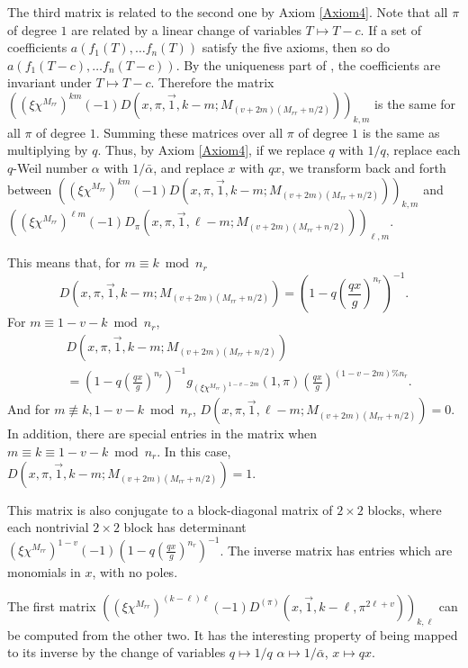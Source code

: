 \documentclass[11pt,letterpaper]{article}
\theoremstyle{definition}
\theoremstyle{remark}
\numberwithin{equation}{section}
\theoremstyle{dotless}
\begin{document}
The third matrix is related to the second one by Axiom \ref{Axiom4}. Note that all $\pi$ of degree $1$ are related by a linear change of variables $T \mapsto T-c$. If a set of coefficients $a(f_1(T), \ldots f_n(T))$ satisfy the five axioms, then so do $a(f_1(T-c), \ldots f_n(T-c))$. By the uniqueness part of \cite[Theorem 1.1]{s-amds}, the coefficients are invariant under $T \mapsto T-c$. Therefore the matrix $\left( (\xi \chi^{M_{rr}})^{k m}(-1)D(x, \pi, \vec{1}, k-m; M_{(v+2m)(M_{rr}+n/2)}) \right)_{k,m}$ is the same for all $\pi$ of degree $1$. Summing these matrices over all $\pi$ of degree $1$ is the same as multiplying by $q$. Thus, by Axiom \ref{Axiom4}, if we replace $q$ with $1/q$, replace each $q$-Weil number $\alpha$ with $1/\bar{\alpha}$, and replace $x$ with $qx$, we transform back and forth between $\left( (\xi \chi^{M_{rr}})^{k m}(-1)D(x, \pi, \vec{1}, k-m; M_{(v+2m)(M_{rr}+n/2)}) \right)_{k,m}$ and $\left((\xi \chi^{M_{rr}})^{\ell m}(-1) D_\pi(x, \pi, \vec{1}, \ell-m; M_{(v+2m)(M_{rr}+n/2)}) \right)_{\ell,m}$.

This means that, for $m\equiv k \bmod n_r$ 
\begin{equation*}
D(x, \pi, \vec{1}, k-m; M_{(v+2m)(M_{rr}+n/2)}) = \left( 1- q\left(\frac{qx}{g}\right)^{n_r}\right)^{-1}. 
\end{equation*}
For $m \equiv 1-v-k \bmod n_r$, 
\begin{equation*} 
\begin{split}
&D(x, \pi, \vec{1}, k-m; M_{(v+2m)(M_{rr}+n/2)}) \\
&= \left( 1- q \left(\frac{qx}{g}\right)^{n_r}\right)^{-1} g_{(\xi \chi^{M_{rr}})^{1-v-2m}}(1, \pi) \left(\frac{q x}{g}\right)^{(1-v-2m)\%n_r}.
\end{split}
\end{equation*}
And for $ m \not\equiv k, 1-v-k \bmod n_r$, $D(x, \pi, \vec{1}, \ell-m; M_{(v+2m)(M_{rr}+n/2)}) = 0$. In addition, there are special entries in the matrix when $m \equiv k \equiv 1-v-k \bmod n_r$. In this case, $D(x, \pi, \vec{1}, k-m; M_{(v+2m)(M_{rr}+n/2)})=1$.

This matrix is also conjugate to a block-diagonal matrix of $2 \times 2$ blocks, where each nontrivial $2 \times 2$ block has determinant $(\xi \chi^{M_{rr}})^{1-v}(-1)\left(1- q\left(\frac{qx}{g}\right)^{n_r}\right)^{-1}$. The inverse matrix has entries which are monomials in $x$, with no poles.

The first matrix $\left( (\xi \chi^{M_{rr}})^{(k-\ell)\ell} (-1)  D^{(\pi)}(x, \vec{1}, k-\ell, \pi^{2\ell+v}) \right)_{k, \ell}$ can be computed from the other two. It has the interesting property of being mapped to its inverse by the change of variables $q \mapsto 1/q$ $\alpha \mapsto 1/\bar{\alpha}$, $x \mapsto qx$. 
\end{document}
